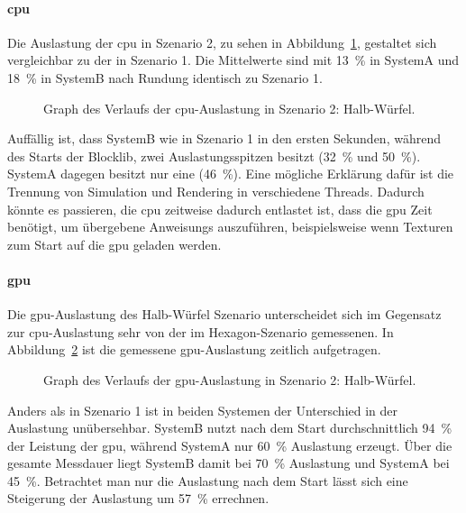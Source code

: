 \paragraph{\ac{cpu}} Die Auslastung der \ac{cpu} in Szenario 2, zu sehen in Abbildung~\ref{fig:seed-0-cube-cpu}, gestaltet sich vergleichbar zu der in Szenario 1. Die Mittelwerte sind mit \SI{13}{\percent} in SystemA und \SI{18}{\percent} in SystemB nach Rundung identisch zu Szenario 1.
\begin{figure}[!htb]
	\caption[Graph des Verlaufs der -Auslastung in Szenario 2: Halb-Würfel.]{Graph des Verlaufs der \ac{cpu}-Auslastung in Szenario 2: Halb-Würfel.}\label{fig:seed-0-cube-cpu}
\end{figure}
Auffällig ist, dass SystemB wie in Szenario 1 in den ersten Sekunden, während des Starts der Blocklib, zwei Auslastungsspitzen besitzt (\SI{32}{\percent} und \SI{50}{\percent}). SystemA dagegen besitzt nur eine (\SI{46}{\percent}). Eine mögliche Erklärung dafür ist die Trennung von Simulation und Rendering in verschiedene Threads. Dadurch könnte es passieren, die \ac{cpu} zeitweise dadurch entlastet ist, dass die \ac{gpu} Zeit benötigt, um übergebene \glspl{Anweisung} auszuführen, beispielsweise wenn Texturen zum Start auf die \ac{gpu} geladen werden.

\paragraph{\ac{gpu}} Die \ac{gpu}-Auslastung des Halb-Würfel Szenario unterscheidet sich im Gegensatz zur \ac{cpu}-Auslastung sehr von der im Hexagon-Szenario gemessenen. In Abbildung~\ref{fig:seed-0-cube-gpu} ist die gemessene \ac{gpu}-Auslastung zeitlich aufgetragen. 
\begin{figure}[!htb]
	\caption[Graph des Verlaufs der -Auslastung in Szenario 2: Halb-Würfel.]{Graph des Verlaufs der \ac{gpu}-Auslastung in Szenario 2: Halb-Würfel.}\label{fig:seed-0-cube-gpu}
\end{figure}
Anders als in Szenario 1 ist in beiden Systemen der Unterschied in der Auslastung unübersehbar. SystemB nutzt nach dem Start durchschnittlich \SI{94}{\percent} der Leistung der \ac{gpu}, während SystemA nur \SI{60}{\percent} Auslastung erzeugt. Über die gesamte Messdauer liegt SystemB damit bei \SI{70}{\percent} Auslastung und SystemA bei \SI{45}{\percent}. Betrachtet man nur die Auslastung nach dem Start lässt sich eine Steigerung der Auslastung um \SI{57}{\percent} errechnen.

